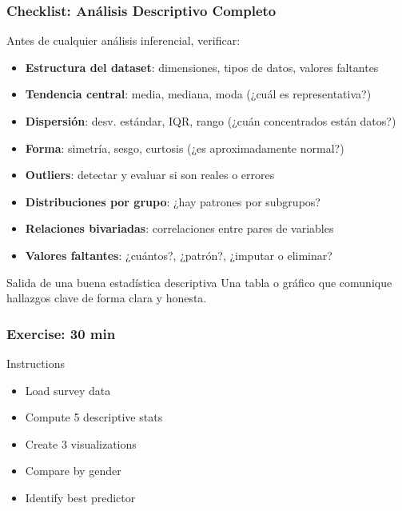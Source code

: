 \documentclass[aspectratio=169,11pt]{beamer}
\begin{document}
\begin{frame}[fragile]
\frametitle{Checklist: Análisis Descriptivo Completo}

\begin{alertblock}{Antes de cualquier análisis inferencial, verificar:}
  \begin{itemize}
    \item[\checkmark] \textbf{Estructura del dataset}: dimensiones, tipos de datos, valores faltantes
    \item[\checkmark] \textbf{Tendencia central}: media, mediana, moda (¿cuál es representativa?)
    \item[\checkmark] \textbf{Dispersión}: desv. estándar, IQR, rango (¿cuán concentrados están datos?)
    \item[\checkmark] \textbf{Forma}: simetría, sesgo, curtosis (¿es aproximadamente normal?)
    \item[\checkmark] \textbf{Outliers}: detectar y evaluar si son reales o errores
    \item[\checkmark] \textbf{Distribuciones por grupo}: ¿hay patrones por subgrupos?
    \item[\checkmark] \textbf{Relaciones bivariadas}: correlaciones entre pares de variables
    \item[\checkmark] \textbf{Valores faltantes}: ¿cuántos?, ¿patrón?, ¿imputar o eliminar?
  \end{itemize}
\end{alertblock}

\pause

\begin{block}{Salida de una buena estadística descriptiva}
  Una tabla o gráfico que comunique hallazgos clave de forma clara y honesta.
\end{block}
\end{frame}

\begin{frame}[fragile]
\frametitle{Exercise: 30 min}
\tiny

\begin{block}{Instructions}
  \begin{itemize}
    \item Load survey data
    \item Compute 5 descriptive stats
    \item Create 3 visualizations
    \item Compare by gender
    \item Identify best predictor
  \end{itemize}
\end{block}
\end{frame}
\end{document}
